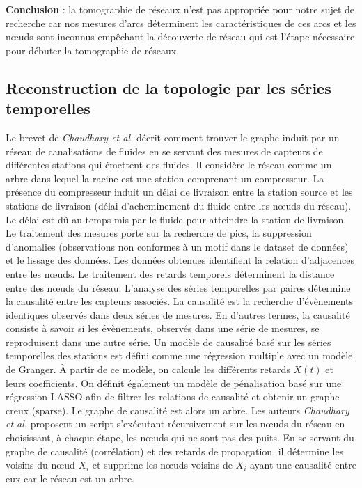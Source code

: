 {\bf Conclusion} :
la tomographie de r\'eseaux n'est pas appropri\'ee pour notre sujet de recherche car nos mesures d'arcs d\'eterminent les caract\'eristiques de ces arcs et les n\oe uds sont inconnus emp\^echant la d\'ecouverte de r\'eseau qui est l'\'etape n\'ecessaire pour d\'ebuter la tomographie de r\'eseaux.


\subsection{Reconstruction de la topologie par les s\'eries temporelles}
Le brevet de {\em Chaudhary et al.} \cite{chaudhary2016network} d\'ecrit comment trouver le graphe induit par un r\'eseau de canalisations de fluides en se servant des mesures de capteurs de diff\'erentes stations qui \'emettent des fluides. Il consid\`ere le r\'eseau comme un arbre dans lequel la racine est une station comprenant un compresseur. La pr\'esence du compresseur induit un d\'elai de livraison entre la station source et les stations de livraison (d\'elai d'acheminement du fluide entre les n\oe uds du r\'eseau). 
Le d\'elai est d\^u au temps mis par le fluide pour atteindre la station de livraison. 
\newline
Le traitement des mesures \cite{cincotta1995astronomical, hurley2011methods, mohanty2000robust} porte sur la recherche de pics, la suppression d'anomalies (observations non conformes \`a un motif dans le dataset de donn\'ees) et le lissage des donn\'ees. 
Les donn\'ees obtenues identifient la relation d'adjacences entre les n\oe uds.
Le traitement des retards temporels d\'eterminent la distance entre des n\oe uds du r\'eseau.
L'analyse des s\'eries temporelles par paires d\'etermine la causalit\'e entre les capteurs associ\'es. 
La causalit\'e est la recherche d'\'ev\`enements identiques observ\'es dans deux s\'eries de mesures.
En d'autres termes, la causalit\'e consiste \`a savoir si les \'ev\`enements, observ\'es dans une s\'erie de mesures, se reproduisent dans une autre s\'erie. 
Un mod\`ele de causalit\'e bas\'e sur les s\'eries temporelles des stations est d\'efini comme une r\'egression multiple avec un mod\`ele de Granger.
\`A partir de ce mod\`ele, on calcule les diff\'erents retards $X(t)$ et leurs coefficients.
On d\'efinit \'egalement un mod\`ele de p\'enalisation bas\'e sur une r\'egression LASSO afin de filtrer les relations de causalit\'e et obtenir un graphe creux (sparse). 
Le graphe de causalit\'e est alors un arbre.
\newline
Les auteurs {\em Chaudhary et al.}  proposent un script s'ex\'ecutant r\'ecursivement sur les n\oe uds du r\'eseau en choisissant, \`a chaque \'etape, les n\oe uds qui ne sont pas des puits. En se servant du graphe de causalit\'e (corr\'elation) et des retards de propagation, il d\'etermine les voisins du n\oe ud $X_i$ et supprime les n\oe uds voisins de $X_i$  ayant une causalit\'e entre eux car le r\'eseau est un arbre.
